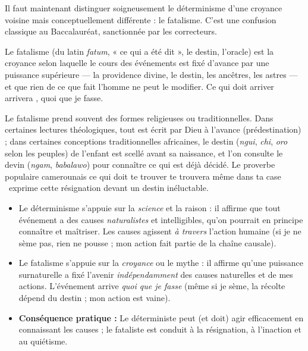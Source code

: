 \documentclass[11pt]{article}
\newcommand{\cle}[1]{{\popxbold\color{popdark}#1}}
\begin{document}
Il faut maintenant distinguer soigneusement le déterminisme d'une croyance voisine mais conceptuellement différente : le \cle{fatalisme}. C'est une confusion classique au Baccalauréat, sanctionnée par les correcteurs.

\begin{definition}[Le fatalisme]
Le \cle{fatalisme} (du latin \emph{fatum}, « ce qui a été dit », le destin, l'oracle) est la croyance selon laquelle le cours des événements est fixé d'avance par une puissance supérieure — la providence divine, le destin, les ancêtres, les astres — et que rien de ce que fait l'homme ne peut le modifier. \guillemotleft Ce qui doit arriver arrivera \guillemotright, quoi que je fasse.
\end{definition}

Le fatalisme prend souvent des formes religieuses ou traditionnelles. Dans certaines lectures théologiques, tout est écrit par Dieu à l'avance (prédestination) ; dans certaines conceptions traditionnelles africaines, le destin (\emph{ngui}, \emph{chi}, \emph{oro} selon les peuples) de l'enfant est scellé avant sa naissance, et l'on consulte le devin (\emph{ngam}, \emph{babalawo}) pour connaître ce qui est déjà décidé. Le proverbe populaire camerounais \guillemotleft ce qui doit te trouver te trouvera même dans ta case \guillemotright\ exprime cette résignation devant un destin inéluctable.

\begin{attention}
\begin{itemize}
\item Le \cle{déterminisme} s'appuie sur la \emph{science} et la raison : il affirme que tout événement a des causes \emph{naturalistes} et intelligibles, qu'on pourrait en principe connaître et maîtriser. Les causes agissent \emph{à travers} l'action humaine (si je ne sème pas, rien ne pousse ; mon action fait partie de la chaîne causale).
\item Le \cle{fatalisme} s'appuie sur la \emph{croyance} ou le mythe : il affirme qu'une puissance surnaturelle a fixé l'avenir \emph{indépendamment} des causes naturelles et de mes actions. L'événement arrive \emph{quoi que je fasse} (même si je sème, la récolte dépend du destin ; mon action est vaine).
\item \textbf{Conséquence pratique :} Le déterministe peut (et doit) agir efficacement en connaissant les causes ; le fataliste est conduit à la résignation, à l'inaction et au quiétisme.
\end{itemize}
\end{attention}
\end{document}
